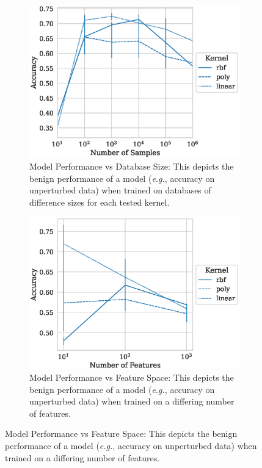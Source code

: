 \documentclass[fonts]{icst}
\begin{document}
\begin{figure}
    \centering
    \begin{subfigure}{.45\textwidth}
        \centering
        \includegraphics[width=\textwidth]{./generated/accuracy_vs_samples.eps}
        \caption{Model Performance vs Database Size: This depicts the benign performance  of a model  (\textit{e.g.}, accuracy on unperturbed data) when trained on databases of difference sizes for each tested kernel.}
        \label{fig:samples_acc}
    \end{subfigure}
    \hfill
    \begin{subfigure}{.45\textwidth}
        \centering
        \includegraphics[width=\textwidth]{./generated/accuracy_vs_features.eps}
        \caption{Model Performance vs Feature Space: This depicts the benign performance of a model (\textit{e.g.}, accuracy on unperturbed data) when trained on a differing number of features.
}
\end{subfigure}
\end{figure}
\end{document}

